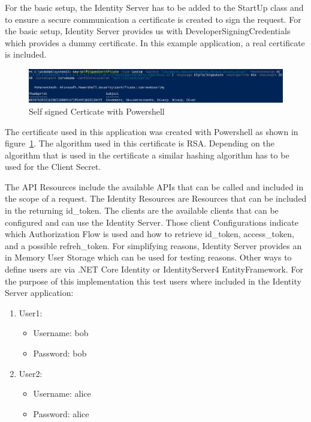 For the basic setup, the Identity Server has to be added to the StartUp class and to ensure a secure communication a certificate is created to sign the request. For the basic setup, Identity Server provides us with DeveloperSigningCredentials which provides a dummy certificate. In this example application, a real certificate is included. 

\begin{figure}[h]
	\centering
	\includegraphics[width=0.9\linewidth]{images/self-signed-certicate}
	\caption{Self signed Certicate with Powershell}
	\label{fig:self-signed-certicate}
\end{figure}

The certificate used in this application was created with Powershell as shown in figure~\ref{fig:self-signed-certicate}. The algorithm used in this certificate is RSA. Depending on the algorithm that is used in the certificate a similar hashing algorithm has to be used for the Client Secret.


The API Resources include the available APIs that can be called and included in the scope of a request. The Identity Resources are Resources that can be included in the returning id\_token. The clients are the available clients that can be configured and can use the Identity Server. Those client Configurations indicate which Authorization Flow is used and how to retrieve id\_token, access\_token, and a possible refreh\_token. For simplifying reasons, Identity Server provides an in Memory User Storage which can be used for testing reasons. Other ways to define users are via .NET Core Identity or IdentityServer4 EntityFramework. For the purpose of this implementation this test users where included in the Identity Server application:
\begin{enumerate}
	\item User1:
	\begin{itemize}
		\item  Username: bob
		\item  Password: bob
	\end{itemize} 
	\item User2:
	\begin{itemize}
		\item  Username: alice
		\item  Password: alice
	\end{itemize} 
\end{enumerate}

